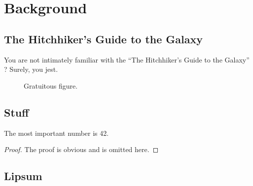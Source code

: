 \chapter{Background}

\section{The Hitchhiker's Guide to the Galaxy}

You are not intimately familiar with the
``The Hitchhiker's Guide to the Galaxy'' \cite{Adams_1980a}?
Surely, you jest.

\begin{figure}
\begin{minipage}{\textwidth}\centering%
%
\end{minipage}%
\caption{Gratuitous figure.}
\end{figure}

\section{Stuff}

\begin{lemma}[Title]
\lipsum*[1]
\end{lemma}

\begin{proposition}[Title]
\lipsum*[1]
\end{proposition}

\begin{corollary}[Title]
\lipsum*[1]
\end{corollary}

\begin{definition}[Term]
\lipsum*[1]
\end{definition}

\begin{theorem}[Title]
The most important number is 42.
\end{theorem}
\begin{proof}
The proof is obvious and is omitted here.
\end{proof}

\begin{example}[Title]
\lipsum*[4]
\end{example}

\begin{example}[Title]
\lipsum*[2]
\end{example}

\section{Lipsum}

\lipsum
\lipsum
\lipsum
\lipsum
